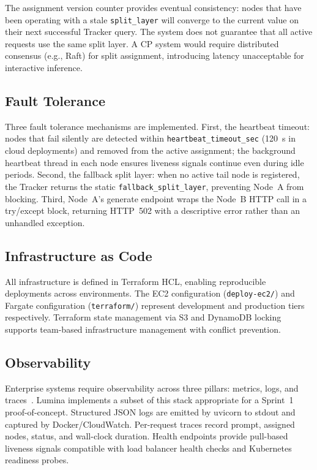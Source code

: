 \documentclass[conference]{IEEEtran}
\begin{document}
The assignment version counter provides eventual consistency: nodes that have
been operating with a stale \texttt{split\_layer} will converge to the current
value on their next successful Tracker query. The system does not guarantee
that all active requests use the same split layer. A CP system would require
distributed consensus (e.g., Raft) for split assignment, introducing latency
unacceptable for interactive inference.

\subsection{Fault Tolerance}

Three fault tolerance mechanisms are implemented. First, the heartbeat timeout:
nodes that fail silently are detected within \texttt{heartbeat\_timeout\_sec}
(120~s in cloud deployments) and removed from the active assignment; the
background heartbeat thread in each node ensures liveness signals continue
even during idle periods. Second, the fallback split layer: when no active
tail node is registered, the Tracker returns the static
\texttt{fallback\_split\_layer}, preventing Node~A from blocking. Third,
Node~A's generate endpoint wraps the Node~B HTTP call in a try/except block,
returning HTTP~502 with a descriptive error rather than an unhandled exception.

\subsection{Infrastructure as Code}

All infrastructure is defined in Terraform HCL, enabling reproducible
deployments across environments. The EC2 configuration (\texttt{deploy-ec2/})
and Fargate configuration (\texttt{terraform/}) represent development and
production tiers respectively. Terraform state management via S3 and DynamoDB
locking supports team-based infrastructure management with conflict prevention.

\subsection{Observability}

Enterprise systems require observability across three pillars: metrics, logs,
and traces~\cite{sridharan2018observability}. Lumina implements a subset of
this stack appropriate for a Sprint~1 proof-of-concept. Structured JSON logs
are emitted by uvicorn to stdout and captured by Docker/CloudWatch. Per-request
traces record prompt, assigned nodes, status, and wall-clock duration. Health
endpoints provide pull-based liveness signals compatible with load balancer
health checks and Kubernetes readiness probes.
\end{document}
